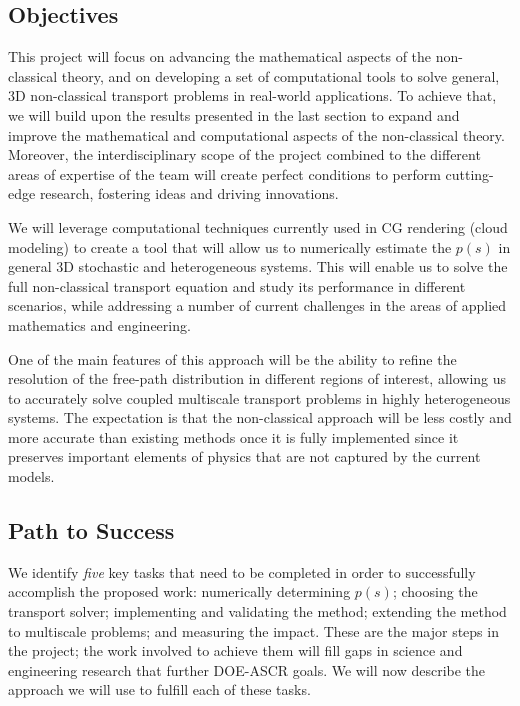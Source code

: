 \documentclass[12pt]{article}
\begin{document}
\subsection{Objectives}

This project will focus on advancing the mathematical aspects of the non-classical theory, and on developing a set of computational tools to solve general, 3D non-classical transport problems in real-world applications.
To achieve that, we will build upon the results presented in the last section to expand and improve the mathematical and computational aspects of the non-classical theory.
Moreover, the interdisciplinary scope of the project combined to the different areas of expertise of the team will create perfect conditions to perform cutting-edge research, fostering ideas and driving innovations.

We will leverage computational techniques currently used in CG rendering (cloud modeling) to create a tool that will allow us to numerically estimate the $p(s)$ in general 3D stochastic and heterogeneous systems.
This will enable us to solve the full non-classical transport equation and study its performance in different scenarios, while addressing a number of current challenges in the areas of applied mathematics and engineering.

One of the main features of this approach will be the ability to refine the resolution of the free-path distribution in different regions of interest, allowing us to accurately solve coupled multiscale transport problems in highly heterogeneous systems.
The expectation is that the non-classical approach will be less costly and more accurate than existing methods once it is fully implemented since it preserves important elements of physics that are not captured by the current models.

\subsection{Path to Success}

We identify \textit{five} key tasks that need to be completed in order to successfully accomplish the proposed work: numerically determining $p(s)$; choosing the transport solver; implementing and validating the method; extending the method to multiscale problems; and measuring the impact.
These are the major steps in the project; the work involved to achieve them will fill gaps in science and engineering research that further DOE-ASCR goals.
We will now describe the approach we will use to fulfill each of these tasks.
\end{document}
